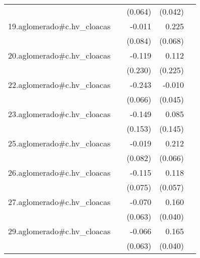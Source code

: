 {\begin{longtable}{l*{4}{D{.}{.}{-1}}}
            &                     &     (0.064)         &     (0.042)         &                     \\
\addlinespace
19.aglomerado#c.hv\_cloacas&                     &      -0.011         &       0.225\sym{***}&                     \\
            &                     &     (0.084)         &     (0.068)         &                     \\
\addlinespace
20.aglomerado#c.hv\_cloacas&                     &      -0.119         &       0.112         &                     \\
            &                     &     (0.230)         &     (0.225)         &                     \\
\addlinespace
22.aglomerado#c.hv\_cloacas&                     &      -0.243\sym{***}&      -0.010         &                     \\
            &                     &     (0.066)         &     (0.045)         &                     \\
\addlinespace
23.aglomerado#c.hv\_cloacas&                     &      -0.149         &       0.085         &                     \\
            &                     &     (0.153)         &     (0.145)         &                     \\
\addlinespace
25.aglomerado#c.hv\_cloacas&                     &      -0.019         &       0.212\sym{**} &                     \\
            &                     &     (0.082)         &     (0.066)         &                     \\
\addlinespace
26.aglomerado#c.hv\_cloacas&                     &      -0.115         &       0.118\sym{*}  &                     \\
            &                     &     (0.075)         &     (0.057)         &                     \\
\addlinespace
27.aglomerado#c.hv\_cloacas&                     &      -0.070         &       0.160\sym{***}&                     \\
            &                     &     (0.063)         &     (0.040)         &                     \\
\addlinespace
29.aglomerado#c.hv\_cloacas&                     &      -0.066         &       0.165\sym{***}&                     \\
            &                     &     (0.063)         &     (0.040)         &                     \\

\end{longtable}}
